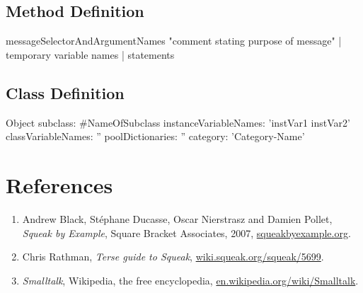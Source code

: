 \documentclass[8pt,a4paper]{leaflet}
\begin{document}
\subsection{Method Definition}

\begin{code}
messageSelectorAndArgumentNames
	"comment stating purpose of message"
	| temporary variable names |
	statements
\end{code}

\subsection{Class Definition}

\begin{code}
Object subclass: #NameOfSubclass
	instanceVariableNames: 'instVar1 instVar2'
	classVariableNames: ''
	poolDictionaries: ''
	category: 'Category-Name'
\end{code}

\section{References}

\begin{enumerate}
	\item Andrew Black, Stéphane Ducasse, Oscar Nierstrasz and Damien Pollet, \emph{Squeak by Example}, Square Bracket Associates, 2007, \url{squeakbyexample.org}.
	\item Chris Rathman, \emph{Terse guide to Squeak}, \url{wiki.squeak.org/squeak/5699}.
	\item \emph{Smalltalk}, Wikipedia, the free encyclopedia, \url{en.wikipedia.org/wiki/Smalltalk}.
	
\end{enumerate}
\end{document}
